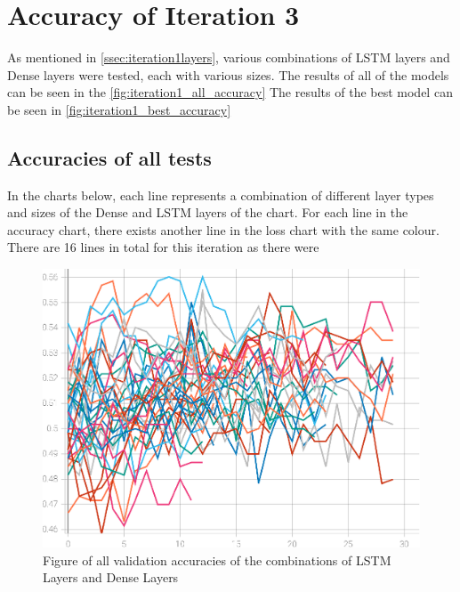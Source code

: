 \section{Accuracy of Iteration 3}
As mentioned in \autoref{ssec:iteration1layers}, various combinations of LSTM layers and Dense layers were tested,
each with various sizes. The results of all of the models can be seen in the \autoref{fig:iteration1_all_accuracy}
The results of the best model can be seen in \autoref{fig:iteration1_best_accuracy}
\subsection{Accuracies of all tests}
In the charts below, each line represents a combination of different layer types and sizes of the Dense and LSTM layers of the chart.
For each line in the accuracy chart, there exists another line in the loss chart with the same colour. There are 16 lines in total
for this iteration as there were 
\begin{figure}[ht]
    \centering
    \includegraphics[width=0.95\columnwidth]{figures/results/cnn_iteration2_all_accuracy.eps}
    \caption[Figure of accuracies and losses for Iteration 3]{Figure of all validation accuracies of the combinations of LSTM Layers and Dense Layers}
    \label{fig:iteration3_all_accuracy}
\end{figure}
\FloatBarrier
